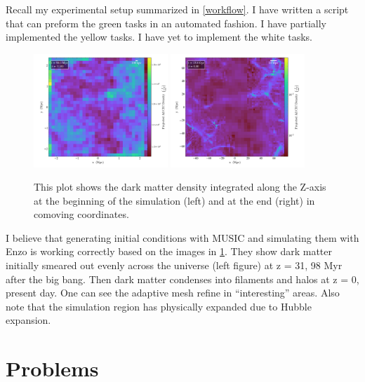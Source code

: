 Recall my experimental setup summarized in \cref{workflow}. I have written a script that can preform the green tasks in an automated fashion. I have partially implemented the yellow tasks. I have yet to implement the white tasks.

\begin{figure}[h!]
  \includegraphics[width=0.45\textwidth]{../../presentation/assets/sim-0.png}
  \includegraphics[width=0.45\textwidth]{../../presentation/assets/sim-1.png}
  \label{cosmology-result}
  \caption{This plot shows the dark matter density integrated along the Z-axis at the beginning of the simulation (left) and at the end (right) in comoving coordinates.}
\end{figure}

I believe that generating initial conditions with MUSIC \cite{hahn_multi-scale_2011} and simulating them with Enzo \cite{collins_cosmological_2010,bryan_enzo_2014} is working correctly based on the images in \cref{cosmology-result}. They show dark matter initially smeared out evenly across the universe (left figure) at z = 31, 98 Myr after the big bang. Then dark matter condenses into filaments and halos at z = 0, present day. One can see the adaptive mesh refine in ``interesting'' areas. Also note that the simulation region has physically expanded due to Hubble expansion.


\section*{Problems}

